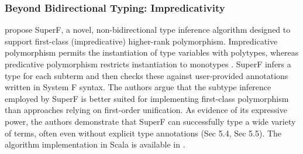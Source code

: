 \subsubsection{Beyond Bidirectional Typing: Impredicativity}

\citeauthor{parreaux-when-2024} \cite{parreaux-when-2024} propose SuperF, a novel, non-bidirectional type inference algorithm designed to support first-class (impredicative) higher-rank polymorphism. Impredicative polymorphism permits the instantiation of type variables with polytypes, whereas predicative polymorphism restricts instantiation to monotypes \cite[Sec 3.4]{jones-practical-2007}. SuperF infers a type for each subterm and then checks these against user-provided annotations written in System F syntax. The authors argue that the subtype inference employed by SuperF is better suited for implementing first-class polymorphism than approaches relying on first-order unification. As evidence of its expressive power, the authors demonstrate that SuperF can successfully type a wide variety of terms, often even without explicit type annotations (Sec 5.4, Sec 5.5). The algorithm implementation in Scala is available in \cite{github-hkust-taco-superf-2025}.